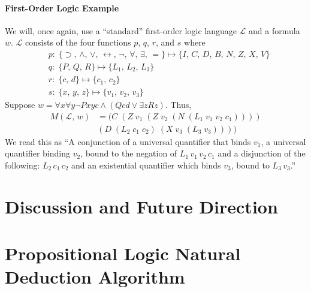 \documentclass[ms]{uncgdissertationexp2}
\theoremstyle{plain}
\theoremstyle{definition}
\theoremstyle{remark}
\begin{document}
\subsubsection{First-Order Logic Example} We will, once again, use a ``standard'' first-order logic language $\mathcal{L}$ and a formula $w$. $\mathcal{L}$ consists of the four functions $p$, $q$, $r$, and $s$ where
\begin{align*}
	  & p:\;\{\supset,\,\land,\,\lor,\,\leftrightarrow,\,\lnot,\,\forall,\,\exists,\,=\}\mapsto \{I,\,C,\,D,\,B,\,N,\,Z,\,X,\,V\} \\
	  & q:\;\{P,\,Q,\,R\} \mapsto \{L_{1},\,L_{2},\,L_{3}\}                                                                       \\
	  & r:\;\{c,\,d\} \mapsto \{c_1,\,c_2\}                                                                                       \\
	  & s:\;\{x,\,y,\,z\} \mapsto \{v_1,\,v_2,\,v_3\}                                                                             
\end{align*}
Suppose $w = \forall{x}\forall{y}\lnot{Pxyc} \land (Qcd \lor \exists{z}Rz)$. Thus,
\begin{align*}
	M(\mathcal{L},\,w) & = (C\;(Z\;v_1\;(Z\;v_2\;(N\;(L_1\;v_1\;v_2\;c_1)))) \\
	                   & (D\;(L_2\;c_1\;c_2)\;(X\;v_3\;(L_3\;v_3))))         
\end{align*}
We read this as ``A conjunction of a universal quantifier that binds $v_1$, a universal quantifier binding $v_2$, bound to the negation of $L_1\,v_1\,v_2\,c_1$ and a disjunction of the following: $L_2\,c_1\,c_2$ and an existential quantifier which binds $v_3$, bound to $L_3\,v_3$.''

\chapter{Discussion and Future Direction}




\nocite{*}

\appendix
\label{appendix:algorithm}
\chapter{Propositional Logic Natural Deduction Algorithm}
\end{document}
